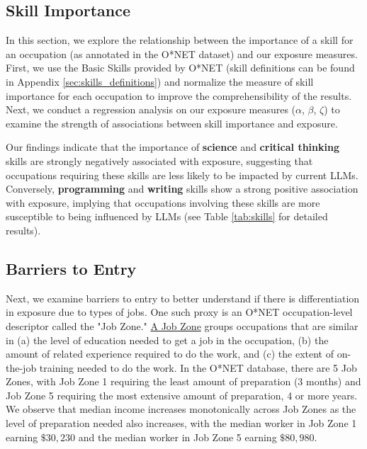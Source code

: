 \documentclass[11pt]{article}
\begin{document}
\subsection{Skill Importance} 

In this section, we explore the relationship between the importance of a skill for an occupation (as annotated in the O*NET dataset) and our exposure measures. First, we use the Basic Skills provided by O*NET (skill definitions can be found in Appendix \ref{sec:skills_definitions}) and normalize the measure of skill importance for each occupation to improve the comprehensibility of the results. Next, we conduct a regression analysis on our exposure measures ($\alpha$, $\beta$, $\zeta$) to examine the strength of associations between skill importance and exposure.

Our findings indicate that the importance of \textbf{science} and \textbf{critical thinking} skills are strongly negatively associated with exposure, suggesting that occupations requiring these skills are less likely to be impacted by current LLMs. Conversely, \textbf{programming} and \textbf{writing} skills show a strong positive association with exposure, implying that occupations involving these skills are more susceptible to being influenced by LLMs (see Table \ref{tab:skills} for detailed results). 



\subsection{Barriers to Entry}

Next, we examine barriers to entry to better understand if there is differentiation in exposure due to types of jobs. One such proxy is an O*NET occupation-level descriptor called the "Job Zone." \href{https://www.onetonline.org/help/online/zones}{A Job Zone} groups occupations that are similar in (a) the level of education needed to get a job in the occupation, (b) the amount of related experience required to do the work, and (c) the extent of on-the-job training needed to do the work. In the O*NET database, there are 5 Job Zones, with Job Zone 1 requiring the least amount of preparation (3 months) and Job Zone 5 requiring the most extensive amount of preparation, 4 or more years. We observe that median income increases monotonically across Job Zones as the level of preparation needed also increases, with the median worker in Job Zone 1 earning $\$30,230$ and the median worker in Job Zone 5 earning $\$80,980$.
\end{document}
